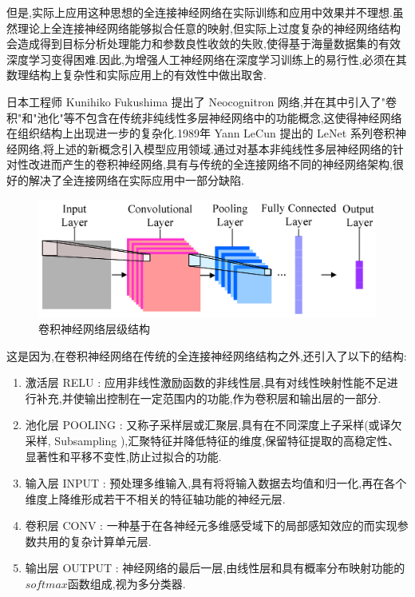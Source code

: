 但是,实际上应用这种思想的全连接神经网络在实际训练和应用中效果并不理想.虽然理论上全连接神经网络能够拟合任意的映射,但实际上过度复杂的神经网络结构会造成得到目标分析处理能力和参数良性收敛的失败,使得基于海量数据集的有效深度学习变得困难.因此,为增强人工神经网络在深度学习训练上的易行性,必须在其数理结构上复杂性和实际应用上的有效性中做出取舍.

日本工程师 Kunihiko Fukushima 提出了 Neocognitron 网络,并在其中引入了"卷积"和"池化"等不包含在传统非纯线性多层神经网络中的功能概念\cite{neocognitron},这使得神经网络在组织结构上出现进一步的复杂化.1989年 Yann LeCun 提出的 LeNet 系列卷积神经网络\cite{LeNet},将上述的新概念引入模型应用领域.通过对基本非纯线性多层神经网络的针对性改进而产生的卷积神经网络,具有与传统的全连接网络不同的神经网络架构,很好的解决了全连接网络在实际应用中一部分缺陷.

\begin{figure}
\centering
\includegraphics[scale=1]{Figures/CNN3.png}
\caption{卷积神经网络层级结构}
\end{figure}

这是因为,在卷积神经网络在传统的全连接神经网络结构之外,还引入了以下的结构:
\begin{enumerate}
	\item 激活层 RELU : 应用非线性激励函数的非线性层,具有对线性映射性能不足进行补充,并使输出控制在一定范围内的功能,作为卷积层和输出层的一部分.
	\item 池化层 POOLING : 又称子采样层或汇聚层,具有在不同深度上子采样(或译欠采样, Subsampling ),汇聚特征并降低特征的维度,保留特征提取的高稳定性、显著性和平移不变性\cite{pingyibubianxing},防止过拟合的功能.
	\item 输入层 INPUT : 预处理多维输入,具有将将输入数据去均值和归一化,再在各个维度上降维形成若干不相关的特征轴功能的神经元层.
	\item 卷积层 CONV : 一种基于在各神经元多维感受域下的局部感知效应的而实现参数共用的复杂计算单元层.
	\item 输出层 OUTPUT : 神经网络的最后一层,由线性层和具有概率分布映射功能的$softmax$函数组成,视为多分类器.
\end{enumerate}


